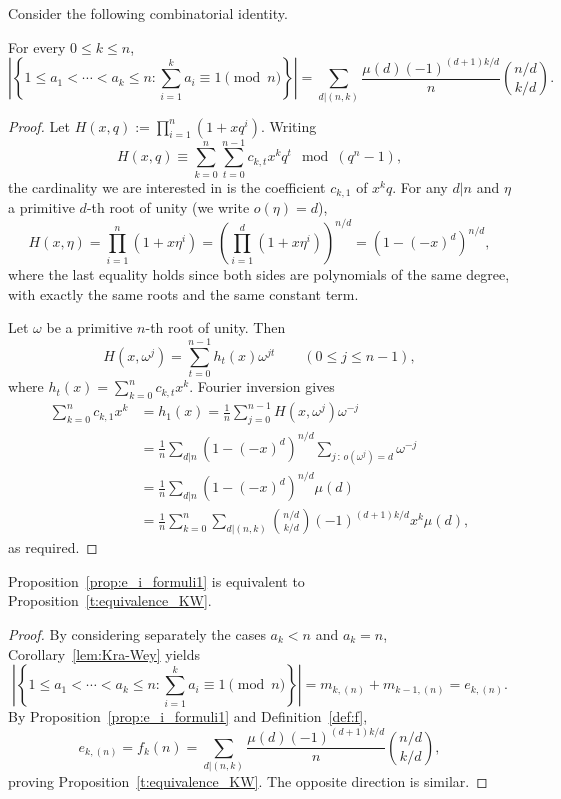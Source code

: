 Consider the following combinatorial identity.

\begin{proposition}\label{t:equivalence_KW}
    For every $0 \le k \le n$,
    \[
        \left| \left\{ 1 \le a_1 < \cdots < a_k \le n : \sum_{i=1}^k a_i\equiv 1 \!\!\!\!\pmod{n} \right\} \right| 
        = \sum_{d|(n,k)} \frac{\mu(d)(-1)^{(d+1)k/d}}{n} \binom{n/d}{k/d}.
    \]
\end{proposition}
	
\begin{proof}
    Let 
    $H(x,q):=\prod_{i=1}^n(1+xq^i)$. 
    Writing
    \[
        H(x,q) \equiv \sum_{k=0}^{n} \sum_{t=0}^{n-1} c_{k,t} x^kq^t \mod (q^n-1),
    \] 
    the cardinality we are interested in is the coefficient $c_{k,1}$ of $x^kq$.
    For any $d|n$ and $\eta$ a primitive $d$-th root of unity (we write $o(\eta)= d$), 
    \[
        H(x,\eta) 
        = \prod_{i=1}^n (1+x\eta^i) 
        = \left( \prod_{i=1}^d (1+x\eta^i) \right)^{n/d} 
        = (1-(-x)^d)^{n/d},
    \]
    where the last equality holds since both sides are polynomials of the same degree, with exactly the same roots and the same constant term. 
    
    Let $\omega$ be a primitive $n$-th root of unity. Then
    \[
        H(x,\omega^j) = \sum_{t=0}^{n-1} h_t(x)\omega^{jt}
        \qquad (0 \le j \le n-1),
    \]
    where $h_t(x) = \sum_{k=0}^n c_{k,t} x^k$. 
    Fourier inversion gives
    \begin{align*}
        \sum_{k=0}^{n} c_{k,1}x^k 
        &= h_1(x)
        = \frac{1}{n} \sum_{j=0}^{n-1} H(x,\omega^j) \omega^{-j} \\
        &= \frac{1}{n} \sum_{d|n}  (1-(-x)^d)^{n/d}
        \sum_{j \,:\, o(\omega^j)=d} \omega^{-j} \\
        &= \frac{1}{n} \sum_{d|n}  (1-(-x)^d)^{n/d}
        \mu(d) \\
        &= \frac{1}{n} \sum_{k=0}^{n} \sum_{d|(n,k)} \binom{n/d}{k/d} (-1)^{(d+1)k/d} x^k \mu(d),
    \end{align*}
    as required.
\end{proof}

\begin{observation}\label{prop:equiv_f_KW}
    Proposition~\ref{prop:e_i_formuli1} is equivalent to Proposition~\ref{t:equivalence_KW}.
\end{observation}

\begin{proof}
    By considering separately the cases $a_k < n$ and $a_k = n$, Corollary~\ref{lem:Kra-Wey} yields 
    \[
        \left| \left\{ 1 \le a_1 < \cdots < a_k \le n : \sum_{i=1}^k a_i \equiv 1 \!\!\!\!\pmod{n} \right\} \right|
        = m_{k,(n)} + m_{k-1,(n)} 
        = e_{k,(n)}.
    \]
    By Proposition~\ref{prop:e_i_formuli1} and Definition~\ref{def:f},
    \[
        e_{k,(n)} 
        = f_k(n)
        = \sum_{d|(n,k)} \frac{\mu(d)(-1)^{(d+1)k/d}}{n} \binom{n/d}{k/d},
    \]
    proving Proposition~\ref{t:equivalence_KW}.
    The opposite direction is similar. 
\end{proof}
    

